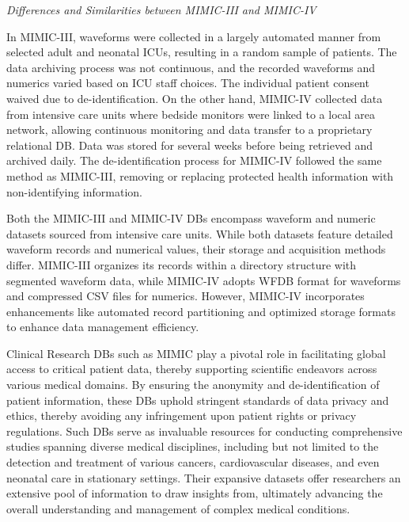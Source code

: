 \vspace{0.2cm}
\textit{Differences and Similarities between MIMIC-III and MIMIC-IV}
\vspace{0.2cm}

In MIMIC-III, waveforms were collected in a largely automated manner from selected adult and neonatal ICUs, resulting in a random sample of patients.
The data archiving process was not continuous, and the recorded waveforms and numerics varied based on ICU staff choices.
The individual patient consent waived due to de-identification.
On the other hand, MIMIC-IV collected data from intensive care units where bedside monitors were linked to a local area network, allowing continuous monitoring and data transfer to a proprietary relational DB.
Data was stored for several weeks before being retrieved and archived daily.
The de-identification process for MIMIC-IV followed the same method as MIMIC-III, removing or replacing protected health information with non-identifying information.

Both the MIMIC-III and MIMIC-IV DBs encompass waveform and numeric datasets sourced from intensive care units.
While both datasets feature detailed waveform records and numerical values, their storage and acquisition methods differ.
MIMIC-III organizes its records within a directory structure with segmented waveform data, while MIMIC-IV adopts WFDB format for waveforms and compressed CSV files for numerics.
However, MIMIC-IV incorporates enhancements like automated record partitioning and optimized storage formats to enhance data management efficiency.

\vspace{0.2cm}

Clinical Research DBs such as MIMIC play a pivotal role in facilitating global access to critical patient data, thereby supporting scientific endeavors across various medical domains.
By ensuring the anonymity and de-identification of patient information, these DBs uphold stringent standards of data privacy and ethics, thereby avoiding any infringement upon patient rights or privacy regulations.
Such DBs serve as invaluable resources for conducting comprehensive studies spanning diverse medical disciplines, including but not limited to the detection and treatment of various cancers, cardiovascular diseases, and even neonatal care in stationary settings.
Their expansive datasets offer researchers an extensive pool of information to draw insights from, ultimately advancing the overall understanding and management of complex medical conditions.

